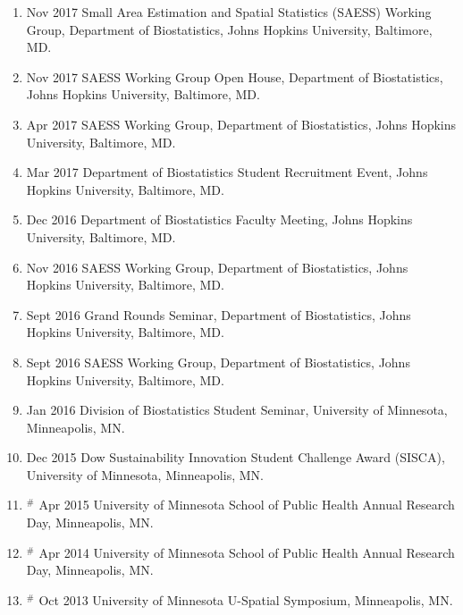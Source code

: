 \documentclass[12pt]{article}
\newcommand{\myben}[1]{\smallskip\begin{enumerate}[start=1,label={\scriptsize \arabic*$\ $},leftmargin=\parindent]\setlength{\itemsep}{#1}\vspace*{-0.7em}}
\newcommand{\ee}{\end{enumerate}}
\begin{document}
\myben{0.3em}
\item Nov 2017 Small Area Estimation
and Spatial Statistics (SAESS) Working Group, Department of Biostatistics, Johns Hopkins University, Baltimore, MD. 
\item Nov 2017 SAESS Working Group Open House, Department of Biostatistics, Johns Hopkins University, Baltimore, MD.
\item Apr 2017 SAESS Working Group, Department of Biostatistics, Johns Hopkins University, Baltimore, MD.
\item Mar 2017 Department of Biostatistics Student Recruitment Event, Johns Hopkins University, Baltimore, MD.
\item Dec 2016 Department of Biostatistics Faculty Meeting, Johns Hopkins University, Baltimore, MD.
\item Nov 2016 SAESS Working Group, Department of Biostatistics, Johns Hopkins University, Baltimore, MD.
\item Sept 2016 Grand Rounds Seminar, Department of Biostatistics, Johns Hopkins University, Baltimore, MD.
\item Sept 2016 SAESS Working Group, Department of Biostatistics, Johns Hopkins University, Baltimore, MD.
\item Jan 2016 Division of Biostatistics Student Seminar, University of Minnesota, Minneapolis,
MN.
\item Dec 2015 Dow Sustainability Innovation Student Challenge Award (SISCA), University of Minnesota, Minneapolis,
MN.
\item $^\#$ Apr 2015 University of Minnesota School of Public Health Annual Research Day, Minneapolis,
MN.
\item $^\#$ Apr 2014 University of Minnesota School of Public Health Annual Research Day, Minneapolis,
MN.
\item $^\#$ Oct 2013 University of Minnesota U-Spatial Symposium, Minneapolis, MN.

\ee
\end{document}
